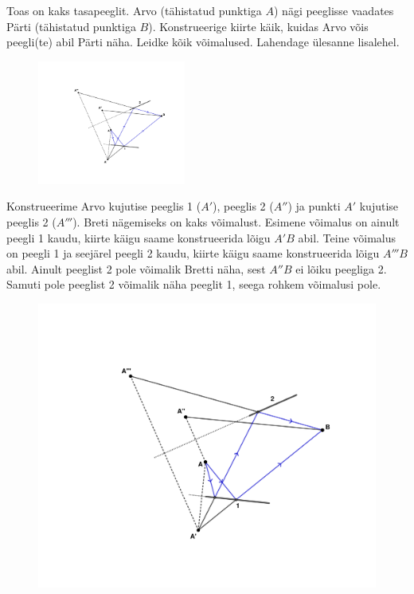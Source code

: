 
Toas on kaks tasapeeglit. Arvo (tähistatud punktiga $A$) nägi peeglisse vaadates Pärti (tähistatud punktiga $B$). Konstrueerige kiirte käik, kuidas Arvo võis peegli(te) abil Pärti näha. Leidke kõik võimalused. Lahendage ülesanne lisalehel.
\begin{figure}[h]
  \vspace{-1em}
  \centering
  \includegraphics[height=11em, trim=0 80 0 140, clip]{2022-v2g-01-yl.pdf}
  \vspace{-2em}
\end{figure}


\hint

\solu
Konstrueerime Arvo kujutise peeglis 1 ($A'$), peeglis 2 ($A''$) ja punkti $A'$ kujutise peeglis 2 ($A'''$). Breti nägemiseks on kaks võimalust. Esimene võimalus on ainult peegli 1 kaudu, kiirte käigu saame konstrueerida lõigu $A'B$ abil. Teine võimalus on peegli 1 ja seejärel peegli 2 kaudu, kiirte käigu saame konstrueerida lõigu $A'''B$ abil. Ainult peeglist 2 pole võimalik Bretti näha, sest $A''B$ ei lõiku peegliga 2. Samuti pole peeglist 2 võimalik näha peeglit 1, seega rohkem võimalusi pole.

\begin{figure}[h]
    \centering
    \includegraphics[width=\textwidth, trim=0 50 0 50, clip]{2022-v2g-01-yl.pdf}
\end{figure}
\probend
